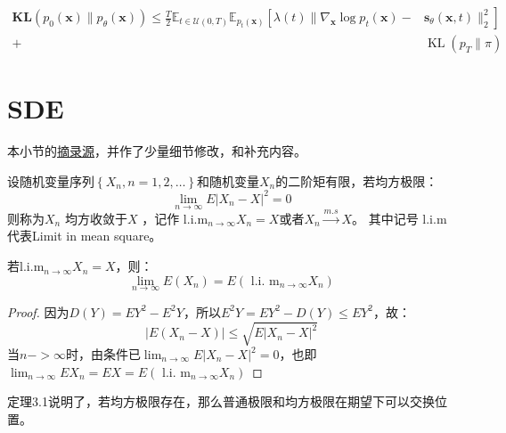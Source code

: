 \documentclass[lang=cn,newtx,10pt,scheme=chinese]{elegantbook}
\begin{document}
\begin{equation}
  \begin{aligned} \mathbf{KL}\left(p_0(\mathbf{x}) \| p_\theta(\mathbf{x})\right) \leq \frac{T}{2} \mathbb{E}_{t \in \mathcal{U}(0, T)} \mathbb{E}_{p_t(\mathbf{x})}\left[\lambda(t) \| \nabla_{\mathbf{x}} \log p_t(\mathbf{x})-\right. 
    & \left.\mathbf{s}_\theta(\mathbf{x}, t) \|_2^2\right] \\ + 
    & \operatorname{KL}\left(p_T \| \pi\right)
  \end{aligned}
\end{equation}


\section{SDE}
本小节的\href{https://zhuanlan.zhihu.com/p/619188621}{摘录源}，并作了少量细节修改，和补充内容。

\begin{definition}
  设随机变量序列$\left\{X_n, n=1,2, \ldots\right\}$和随机变量$ X_n$的二阶矩有限，若均方极限：
  \begin{equation}
    \lim _{n \rightarrow \infty} E\left|X_n-X\right|^2=0
  \end{equation}
 则称为$X_n$ 均方收敛于$X$ ，记作  $\mathrm{l.i.m}_{n \rightarrow \infty} X_n=X$或者$X_n \xrightarrow{m . s} X$。
 其中记号 l.i.m代表Limit in mean square。
\end{definition}

\begin{theorem}
  若$\mathrm{l.i.m}_{n \rightarrow \infty} X_n=X$，则：
  \begin{equation}
    \lim _{n \rightarrow \infty} E\left(X_n\right)=E\left(\text { l.i. } \mathrm{m}_{n \rightarrow \infty} X_n\right)
  \end{equation}
\end{theorem}

\begin{proof}
  因为$D(Y)=E Y^2-E^2 Y$，所以$E^2Y = EY^2 - D(Y) \leq EY^2$，故：
  \begin{equation}
    \left|E\left(X_n-X\right)\right| \leq \sqrt{E\left|X_n-X\right|^2}
  \end{equation}
  当$n->\infty$时，由条件已$\lim _{n \rightarrow \infty} E\left|X_n-X\right|^2=0$，也即
  $\lim _{n \rightarrow \infty} E X_n=E X=E\left(\right.$ l.i. $\left.\mathrm{m}_{n \rightarrow \infty} X_n\right)$
\end{proof}
定理3.1说明了，若均方极限存在，那么普通极限和均方极限在期望下可以交换位置。
\end{document}

